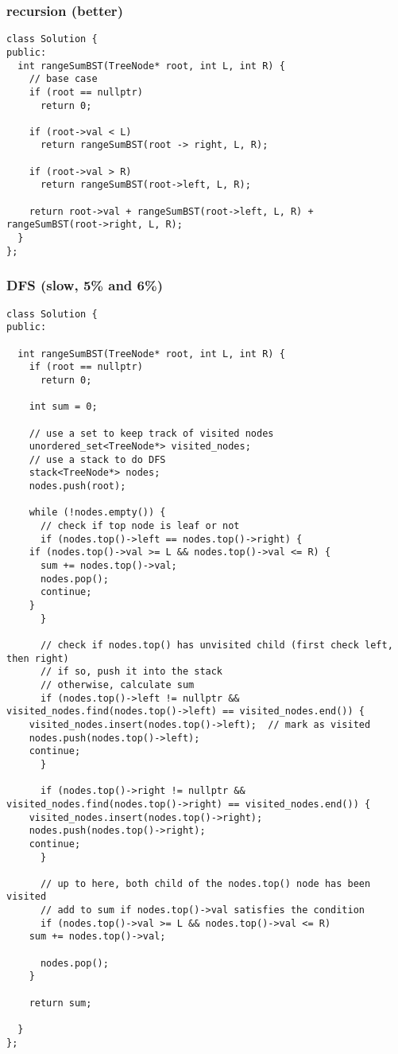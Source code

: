 \documentclass[12pt]{book}
\begin{document}
\subsubsection{recursion (better)}
\label{sec:orgee9018f}
\begin{verbatim}
class Solution {
public:
  int rangeSumBST(TreeNode* root, int L, int R) {
    // base case 
    if (root == nullptr)
      return 0;

    if (root->val < L)
      return rangeSumBST(root -> right, L, R);

    if (root->val > R)
      return rangeSumBST(root->left, L, R);

    return root->val + rangeSumBST(root->left, L, R) + rangeSumBST(root->right, L, R);
  }
};
\end{verbatim}

\subsubsection{DFS (slow, 5\% and 6\%)}
\label{sec:org37d68e5}
\begin{verbatim}
class Solution {
public:

  int rangeSumBST(TreeNode* root, int L, int R) {
    if (root == nullptr)
      return 0;

    int sum = 0;

    // use a set to keep track of visited nodes 
    unordered_set<TreeNode*> visited_nodes;
    // use a stack to do DFS
    stack<TreeNode*> nodes;
    nodes.push(root);

    while (!nodes.empty()) {
      // check if top node is leaf or not
      if (nodes.top()->left == nodes.top()->right) {
	if (nodes.top()->val >= L && nodes.top()->val <= R) {
	  sum += nodes.top()->val;
	  nodes.pop();
	  continue;
	}
      }

      // check if nodes.top() has unvisited child (first check left, then right)
      // if so, push it into the stack 
      // otherwise, calculate sum 
      if (nodes.top()->left != nullptr && visited_nodes.find(nodes.top()->left) == visited_nodes.end()) {
	visited_nodes.insert(nodes.top()->left);  // mark as visited 
	nodes.push(nodes.top()->left);
	continue;
      }

      if (nodes.top()->right != nullptr && visited_nodes.find(nodes.top()->right) == visited_nodes.end()) {
	visited_nodes.insert(nodes.top()->right);
	nodes.push(nodes.top()->right);
	continue;
      }

      // up to here, both child of the nodes.top() node has been visited
      // add to sum if nodes.top()->val satisfies the condition 
      if (nodes.top()->val >= L && nodes.top()->val <= R)
	sum += nodes.top()->val;

      nodes.pop();
    }

    return sum;

  }
};
\end{verbatim}
\end{document}
